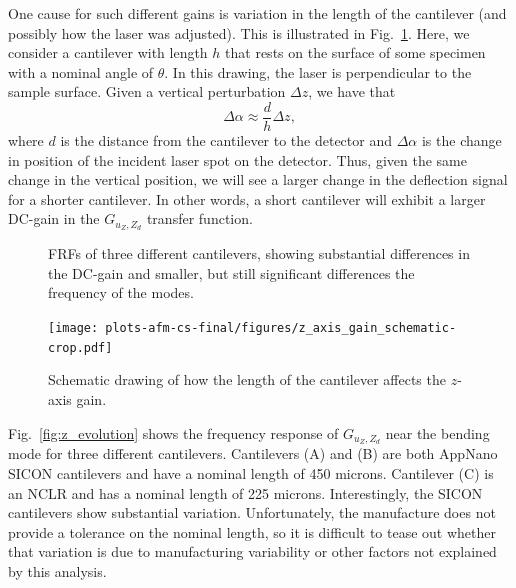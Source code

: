 \documentclass[twocolumn,twoside]{IEEEtran/IEEEtran}
\begin{document}
One cause for such different gains is variation in the length of the cantilever
(and possibly how the laser was adjusted). This is illustrated in
Fig.~\ref{fig:z_axis_gain}. Here, we consider a cantilever with length $h$ that
rests on the surface of some specimen with a nominal angle of $\theta$. In this
drawing, the laser is perpendicular to the sample surface. Given a vertical
perturbation $\Delta z$, we have that
\begin{equation}
  \Delta \alpha \approx \frac{d}{h} \Delta z,
\end{equation}
where $d$ is the distance from the cantilever to the detector and
$\Delta \alpha$ is the change in position of the incident laser spot on the
detector. Thus, given the same change in the vertical position, we will see a
larger change in the deflection signal for a shorter cantilever. In other words,
a short cantilever will exhibit a larger DC-gain in the $G_{u_Z,Z_d}$ transfer
function.
\begin{figure}
  \begin{minipage}[t]{.46\textwidth}
    
    \caption{FRFs of three different cantilevers, showing substantial
      differences in the DC-gain and smaller, but still significant differences
      the frequency of the modes.}
    \label{fig:z_evolution}
  \end{minipage}
  \hfill
  \begin{minipage}[t]{.46\textwidth}
    \texttt{[image: plots-afm-cs-final/figures/z\_axis\_gain\_schematic-crop.pdf]}
    \caption{Schematic drawing of how the length of the cantilever affects the
      $z$-axis gain.}
    \label{fig:z_axis_gain}
  \end{minipage}
\end{figure}

Fig.~\ref{fig:z_evolution} shows the frequency response of $G_{u_Z,Z_d}$ near
the bending mode for three different cantilevers. Cantilevers (A) and (B) are
both AppNano SICON cantilevers and have a nominal length of 450 microns.
Cantilever (C) is an NCLR and has a nominal length of 225 microns.
Interestingly, the SICON cantilevers show substantial variation. Unfortunately,
the manufacture does not provide a tolerance on the nominal length, so it is
difficult to tease out whether that variation is due to manufacturing
variability or other factors not explained by this analysis.
\end{document}

